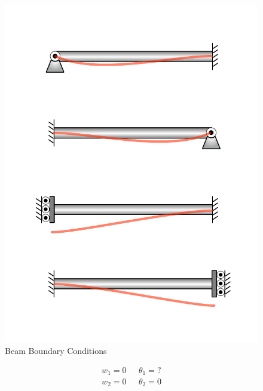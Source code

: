 \begin{figure}[H]	\centerline{\includegraphics[width=0.9\columnwidth]{Figures/BCFrame}}
	\caption{Beam Boundary Conditions}
	\label{fig:BCFrame}
\end{figure}

\begin{align*}
	w_1=0 & \text{	} \theta_1=?\\
	w_2=0 &\text{	}  \theta_2=0
\end{align*}